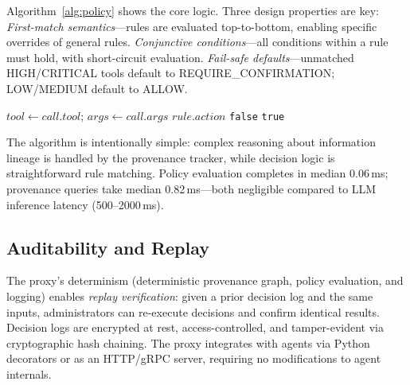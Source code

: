 Algorithm~\ref{alg:policy} shows the core logic. Three design properties are key:
\emph{First-match semantics}---rules are evaluated top-to-bottom, enabling specific overrides of general rules.
\emph{Conjunctive conditions}---all conditions within a rule must hold, with short-circuit evaluation.
\emph{Fail-safe defaults}---unmatched HIGH/CRITICAL tools default to REQUIRE\_CONFIRMATION; LOW/MEDIUM default to ALLOW.

\begin{algorithm}[t]
\caption{Policy Evaluation Algorithm}
\label{alg:policy}
\begin{algorithmic}[1]
  \State $tool \gets call.tool$; $args \gets call.args$
        \State \Return $rule.action$  
      \EndIf
    \EndIf
  \EndFor
  \State \Return {}
\EndProcedure
{}
      \State \Return \texttt{false}
    \EndIf
  \EndFor
  \State \Return \texttt{true}
\EndProcedure
\end{algorithmic}
\end{algorithm}

The algorithm is intentionally simple: complex reasoning about information lineage is handled by the provenance tracker, while decision logic is straightforward rule matching. Policy evaluation completes in median 0.06\,ms; provenance queries take median 0.82\,ms---both negligible compared to LLM inference latency (500--2000\,ms).

\subsection{Auditability and Replay}

The proxy's determinism (deterministic provenance graph, policy evaluation, and logging) enables \emph{replay verification}: given a prior decision log and the same inputs, administrators can re-execute decisions and confirm identical results. Decision logs are encrypted at rest, access-controlled, and tamper-evident via cryptographic hash chaining. The proxy integrates with agents via Python decorators or as an HTTP/gRPC server, requiring no modifications to agent internals.
